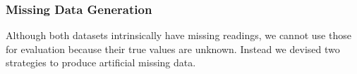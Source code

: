 







\subsubsection{Missing Data Generation}


Although both datasets intrinsically have missing readings, we cannot use those for evaluation because their true values are unknown.
Instead we devised two strategies to produce artificial missing data.

